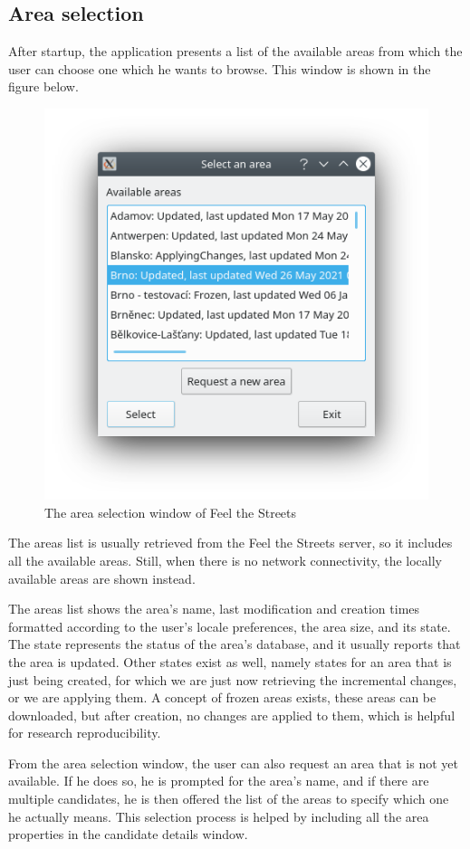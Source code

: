 \documentclass[nolof,digital]{fithesis3}
\begin{document}
\subsection{Area selection}
After startup, the application presents a list of the available areas from which the user can choose one which he wants to browse. This window is shown in the figure below.
\begin{figure}[h]
\caption{The area selection window of Feel the Streets}
\includegraphics{fts-areas}
\end{figure}
The areas list is usually retrieved from the Feel the Streets server, so it includes all the available areas. Still, when there is no network connectivity, the locally available areas are shown instead.

The areas list shows the area's name, last modification and creation times formatted according to the user's locale preferences, the area size, and its state. The state represents the status of the area's database, and it usually reports that the area is updated. Other states exist as well, namely states for an area that is just being created, for which we are just now retrieving the incremental changes, or we are applying them. A  concept of frozen areas exists, these areas can be downloaded, but after creation, no changes are applied to them, which is helpful for research reproducibility.

From the area selection window, the user can also request an area that is not yet available. If he does so, he is prompted for the area's name, and if there are multiple candidates, he is then offered the list of the areas to specify which one he actually means. This selection process is helped by including all the area properties in the candidate details window.
\end{document}
